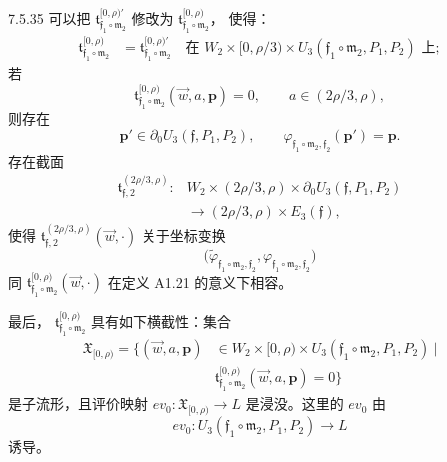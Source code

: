 \begin{lemma}{7.5.35}\label{lem:7-5-35}
可以把
$\mathfrak t_{\mathfrak f_1\circ\mathfrak m_2}^{[0,\rho)'}$
修改为
$\mathfrak t_{\mathfrak f_1\circ\mathfrak m_2}^{[0,\rho)}$，
使得：
\begin{align}
\mathfrak t_{\mathfrak f_1\circ\mathfrak m_2}^{[0,\rho)}
&=
\mathfrak t_{\mathfrak f_1\circ\mathfrak m_2}^{[0,\rho)'}
\quad\text{在 }W_2\times[0,\rho/3)\times
U_3(\mathfrak f_1\circ\mathfrak m_2,P_1,P_2)\text{ 上};
\tag{7.5.36.1}\label{eq:7-5-36-1}
\end{align}
\textup{若}
\begin{equation*}
\mathfrak t_{\mathfrak f_1\circ\mathfrak m_2}^{[0,\rho)}
(\vec w,a,\mathbf p)=0,
\qquad a\in(2\rho/3,\rho),
\end{equation*}
\textup{则存在}
\begin{equation}
\mathbf p'\in\partial_0U_3(\mathfrak f,P_1,P_2),
\qquad
\varphi_{\mathfrak f_1\circ\mathfrak m_2,\mathfrak f_2}
(\mathbf p')=\mathbf p.
\tag{7.5.36.2}\label{eq:7-5-36-2}
\end{equation}
\textup{存在截面}
\begin{equation}
\begin{aligned}
\mathfrak t_{\mathfrak f,2}^{(2\rho/3,\rho)}\colon
&W_2\times(2\rho/3,\rho)\times
\partial_0U_3(\mathfrak f,P_1,P_2)\\
&\longrightarrow(2\rho/3,\rho)\times E_3(\mathfrak f),
\end{aligned}
\tag{7.5.36.3}\label{eq:7-5-36-3}
\end{equation}
\textup{使得}
$\mathfrak t_{\mathfrak f,2}^{(2\rho/3,\rho)}(\vec w,\cdot)$
\textup{关于坐标变换}
\[
\bigl(
\widetilde\varphi_{\mathfrak f_1\circ\mathfrak m_2,\mathfrak f_2},
\varphi_{\mathfrak f_1\circ\mathfrak m_2,\mathfrak f_2}
\bigr)
\]
\textup{同}
$\mathfrak t_{\mathfrak f_1\circ\mathfrak m_2}^{[0,\rho)}
(\vec w,\cdot)$
\textup{在定义 A1.21 的意义下相容。}

\textup{最后，}
$\mathfrak t_{\mathfrak f_1\circ\mathfrak m_2}^{[0,\rho)}$
\textup{具有如下横截性：集合}
\begin{equation}
\begin{aligned}
\mathfrak X_{[0,\rho)}
=\bigl\{(\vec w,a,\mathbf p)&\in
W_2\times[0,\rho)\times
U_3(\mathfrak f_1\circ\mathfrak m_2,P_1,P_2)\ \big|\\
&\mathfrak t_{\mathfrak f_1\circ\mathfrak m_2}^{[0,\rho)}
(\vec w,a,\mathbf p)=0\bigr\}
\end{aligned}
\tag{7.5.36.4}\label{eq:7-5-36-4}
\end{equation}
\textup{是子流形，且评价映射}
$ev_0\colon\mathfrak X_{[0,\rho)}\to L$
\textup{是浸没。这里的 $ev_0$ 由}
\[
ev_0\colon
U_3(\mathfrak f_1\circ\mathfrak m_2,P_1,P_2)
\longrightarrow L
\]
\textup{诱导}。
\end{lemma}

